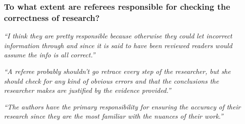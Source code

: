 \documentclass[12pt]{beamer}
\newcommand\ans[1]{{\it ``#1''}}
\begin{document}
\begin{frame}  %
  \frametitle{To what extent are referees responsible for checking the correctness of research?} 


  \ans{I think they are pretty responsible because otherwise they could let incorrect information through and since it is said to have been reviewed readers would assume the info is all correct.}

  \ans{A referee probably shouldn’t go retrace every step of the researcher,  but she should check for any kind of obvious errors and that the conclusions the researcher makes are justified by the evidence provided.}

  \ans{The authors have the primary responsibility for ensuring the accuracy of their research since  they  are  the  most  familiar  with  the  nuances  of  their  work.}
  










\end{frame}
\end{document}
